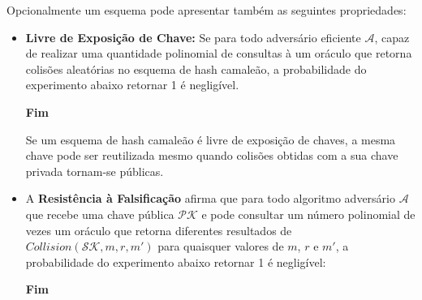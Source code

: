 \documentclass[a4paper]{article}
\begin{document}
Opcionalmente um esquema pode apresentar também as seguintes
propriedades:

\begin{itemize}
\item\textbf{Livre de Exposição de Chave:} Se para todo adversário
  eficiente $\mathcal{A}$, capaz de realizar uma quantidade polinomial
  de consultas à um oráculo que retorna colisões aleatórias no esquema
  de hash camaleão, a probabilidade do experimento abaixo retornar 1 é
  negligível.

\noindent
  \begin{algorithm}[H]
    \SetAlgoLined
     \textbf{Fim}
  \end{algorithm}

  Se um esquema de hash camaleão é livre de exposição de chaves, a
  mesma chave pode ser reutilizada mesmo quando colisões obtidas com a
  sua chave privada tornam-se públicas.
  
\item A \textbf{Resistência à Falsificação} afirma que para todo algoritmo
  adversário $\mathcal{A}$ que recebe uma chave pública $\mathcal{PK}$
  e pode consultar um número polinomial de vezes um oráculo que
  retorna diferentes resultados de $Collision(\mathcal{SK}, m, r, m')$
  para quaisquer valores de $m$, $r$ e $m'$, a probabilidade do
  experimento abaixo retornar 1 é negligível:

  \noindent
  \begin{algorithm}[H]
    \SetAlgoLined
     \textbf{Fim}
  \end{algorithm}


\end{itemize}
\end{document}

